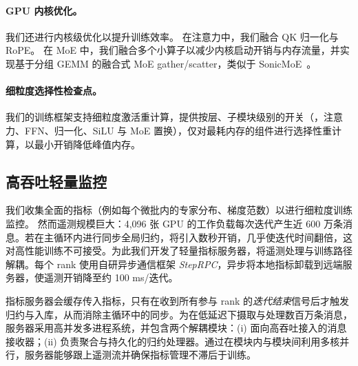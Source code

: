 \paragraph{GPU 内核优化。}
我们还进行内核级优化以提升训练效率。
在注意力中，我们融合 QK 归一化与 RoPE。
在 MoE 中，我们融合多个小算子以减少内核启动开销与内存流量，并实现基于分组 GEMM 的融合式 MoE gather/scatter，类似于 SonicMoE~\cite{guo2025sonicmoeacceleratingmoeio}。



\paragraph{细粒度选择性检查点。}
我们的训练框架支持细粒度激活重计算，提供按层、子模块级别的开关（\eg，注意力、FFN、归一化、SiLU 与 MoE 置换），仅对最耗内存的组件进行选择性重计算，以最小开销降低峰值内存。



\subsection{高吞吐轻量监控}\label{sec:log}

我们收集全面的指标（例如每个微批内的专家分布、梯度范数）以进行细粒度训练监控。
然而遥测规模巨大：4,096 张 GPU 的工作负载每次迭代产生近 600 万条消息。若在主循环内进行同步全局归约，将引入数秒开销，几乎使迭代时间翻倍，这对高性能训练不可接受。为此我们开发了轻量指标服务器，将遥测处理与训练路径解耦。每个 rank 使用自研异步通信框架 \textit{StepRPC}，异步将本地指标卸载到远端服务器，使遥测开销降至约 100 ms/迭代。


指标服务器会缓存传入指标，只有在收到所有参与 rank 的\textit{迭代结束}信号后才触发归约与入库，从而消除主循环中的同步。为在低延迟下摄取与处理数百万条消息，服务器采用高并发多进程系统，并包含两个解耦模块：(i) 面向高吞吐接入的消息接收器；(ii) 负责聚合与持久化的归约处理器。通过在模块内与模块间利用多核并行，服务器能够跟上遥测流并确保指标管理不滞后于训练。
